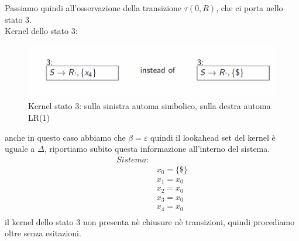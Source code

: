 \documentclass[class=book, crop=false, oneside, 12pt]{standalone}
\begin{document}
Passiamo quindi all'osservazione della transizione \(\tau(0,R)\), che ci porta nello stato 3.
\\
Kernel dello stato 3:
\begin{figure}
    \centering
    \includegraphics[width=.7\textwidth]{ex_automa_simbolico-kernel_s3.png}
    \caption{Kernel stato 3: sulla sinistra automa simbolico, sulla destra automa LR(1)}
\end{figure}
anche in questo caso abbiamo che \(\beta = \varepsilon\) quindi il lookahead set del kernel è uguale a \(\Delta\), riportiamo subito questa informazione all'interno del sistema.
\begin{align*}
    Sistema:& \\
            & x_0 = \{\$\} \\
            & x_1 = x_0 \\
            & x_2 = x_0 \\
            & x_3 = x_0 \\
            & x_4 = x_0 \\
\end{align*}
il kernel dello stato 3 non presenta nè chiusure nè transizioni, quindi procediamo oltre senza esitazioni.
\end{document}
